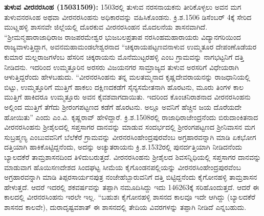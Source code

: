 \textbf{ತುಳುವ ವೀರನರಸಿಂಹ (15031509):} 1503ರಲ್ಲಿ ತುಳುವ ನರಸನಾಯಕನು ತೀರಿಕೊಳ್ಳಲು ಅವನ ಮಗ ತುಳುವನರಸಿಂಹ ಅಥವಾ ವೀರನರಸಿಂಹನು ಅಧಿಕಾರವನ್ನು ವಹಿಸಿಕೊಂಡನು. ಕ್ರಿ.ಶ.1506 ಡಿಸೆಂಬರ್​ 4ಕ್ಕೆ ಸೇರಿದ ಮುಟ್ಣಹಳ್ಳಿ ಶಾಸನವೇ ಜಿಲ್ಲೆಯಲ್ಲಿ ದೊರಕುವ ವೀರನರಸಿಂಹನ ಮೊದಲನೆಯ ಶಾಸನವಾಗಿದೆ. “ಶ‍್ರೀಮನ್ಮಹಾರಾಜಾಧಿರಾಜ ರಾಜಪರಮೇಶ್ವರ ಭುಜಬಲಪ್ರತಾಪ ನರಸಿಂಹಮಹಾರಾಯರು ವಿದ್ಯಾನಗರಿಯಿಂದ ರಾಜ್ಯವಾಳುತ್ತಿದ್ದಾಗ, ಅವನ\break ಮಹಾಮಂಡಲೇಶ್ವರನಾದ “ಚಿಕ್ಕರಾಯಪಟ್ಟಣವನಾಳುವ ಉಮ್ಮತೂರ ದೇಪಂಣೊಡೆಯರ ಕುಮಾರ ಮಲ್ಲರಾಜಗಳೆಂಬ ಹೆಸರಿನ ಚಿಕ್ಕರಾಯನು ಮೊನೆಮುಟ್ಟರಹಳ್ಳಿ ಎಂಬ ಗ್ರಾಮವನ್ನು ನಾಗಭಟ್ಟನಿಗೆ ದತ್ತಿ ನೀಡಿದನು. ಇದರಿಂದ ಉಮ್ಮತ್ತೂರಿನ ಅರಸರು ವಿಜಯನಗರ ಸಾಮ್ರಾಜ್ಯದ ತುಳುವ ಅರಸರಿಗೆ ವಿಧೇಯರಾಗಿ ಆಳುತ್ತಿದ್ದರೆಂದು ಹೇಳಬಹುದು. “ವೀರನರಸಿಂಹನು ತನ್ನ ಮಲತಮ್ಮನಾದ ಕೃಷ್ಣದೇವರಾಯನನ್ನು ರಾಜಧಾನಿಯಲ್ಲಿ ಬಿಟ್ಟು, ಉಮ್ಮತ್ತೂರಿಗೆ ಮುತ್ತಿಗೆ ಹಾಕಲು ದಕ್ಷಿಣದಕಡೆಗೆ ಸೈನ್ಯಸಮೇತನಾಗಿ ಹೊರಟನು, ಮೂರು ತಿಂಗಳ ಕಾಲ ಮುತ್ತಿಗೆ ಹಾಕಿದರೂ ಉಮ್ಮತ್ತೂರು ಅವನ ಕೈವಶವಾಗದಾಯಿತು. ಇದರಿಂದ ಕೊಂಚನಿರಾಶನಾದ ವೀರನರಸಿಂಹನು ಅಲ್ಲಿಂದ ಮುತ್ತಿಗೆ ತೆಗೆದು ಶ‍್ರೀರಂಗಪಟ್ಟಣದ ಕಡೆಗೆ ಹೊರಟನು. ಅಲ್ಲೂ ಅವನಿಗೆ ಹೆಚ್ಚಿನ ಜಯ ದೊರೆಯದೇ ಹೋಯಿತು” ಎಂದು ಎಂ.ವಿ. ಕೃಷ್ಣರಾವ್​ ಹೇಳಿದ್ದಾರೆ. ಕ್ರಿ.ಶ.1508ರಲ್ಲಿ ರಾಜಾಧಿರಾಜೇಂದ್ರನೆಂದು ಬಿರುದಾಂಕಿತನಾದ ವೀರನರಸಿಂಹನು ಶ‍್ರೀಶೈಲದಲ್ಲಿ ಸಪ್ತಸಾಗರ ದಾನವನ್ನು ಮಾಡುವ ಸಂದರ್ಭದಲ್ಲಿ ಶ‍್ರೀರಂಗಪಟ್ಟಣದ ಶ‍್ರೀನಿವಾಸನ ಮಗ ಸುಬ್ರಹ್ಮಣ್ಯ ಎಂಬುವವನಿಗೆ ಬೆಲೆಕೆರೆ ಗ್ರಾಮವನ್ನು ವೀರನರಸಿಂಹೇಂದ್ರಪುರವೆಂಬ ಅಗ್ರಹಾರವನ್ನಾಗಿ ಮಾಡಿ ಏಕಭೋಗ ದತ್ತಿಯಾಗಿ ಹಾಕಿಕೊಟ್ಟಿದ್ದನೆಂದು, ಅದನ್ನು ಅಚ್ಯುತರಾಯನು ಕ್ರಿ.ಶ.1532ರಲ್ಲಿ ಪುನರ್ದತ್ತಿಯಾಗಿ ನೀಡಿದನೆಂದು ಬ್ಯಾಲದಕೆರೆ ತಾಮ್ರಶಾಸನದಿಂದ ತಿಳಿದುಬರುತ್ತದೆ. ವೀರನರಸಿಂಹನು ಶ‍್ರೀಶೈಲದ ಶಿವಸನ್ನಿಧಿಯಲ್ಲಿ ಸಪ್ತಸಾಗರ ದಾನವನ್ನು ಮಾಡುವಾಗ ಹೊಯಿಸಣದೇಶದ ಸಿಂದಘಟ್ಟ ಸೀಮೆಯ ಕೈಗೊಂಡನಪಲ್ಲಿಯನ್ನು ವೀರನರಸಿಂಹೇಂದ್ರಪುರವೆಂಬ ಅಗ್ರಹಾರವನ್ನಾಗಿ ಮಾಡಿ ತಿಪ್ಪರಸಾರ್ಯನಪುತ್ರ ನಂಜೇಹೆಬ್ಬಾರುವನಿಗೆ ದತ್ತಿ ಬಿಟ್ಟಿದ್ದನೆಂದು ಕೈಗೋನಹಳ್ಳಿ ತಾಮ್ರಶಾಸನ ಹೇಳುತ್ತದೆ. ಆದರೆ ಇದರಲ್ಲಿ ಶಕವರ್ಷವನ್ನು ತಪ್ಪಾಗಿ ನಮೂದಿಸಿದ್ದು ಇದು 146263ಕ್ಕೆ ಸರಿಹೊಂದುತ್ತದೆ. ಆದರೆ ಈ ಕಾಲದಲ್ಲಿ ವೀರನರಸಿಂಹನು ಇರಲೇ ಇಲ್ಲ. “ಬಹುಶಃ ಕೈಗೋನಹಳ್ಳಿ ಶಾಸನದ ಕಾಲವೂ ಇದೇ ಆಗಿದ್ದು (ಬ್ಯಾಲದಕೆರೆ ಶಾಸನದ ಕಾಲವೇ), ದುರಾದೃಷ್ಟವಶಾತ್​ ಈ ಶಾಸನದಲ್ಲಿ ತೇದಿಯ ವಿವರಗಳನ್ನು ತಪ್ಪಾಗಿ ನೀಡಿದೆ ಎನ್ನಬಹುದು.

